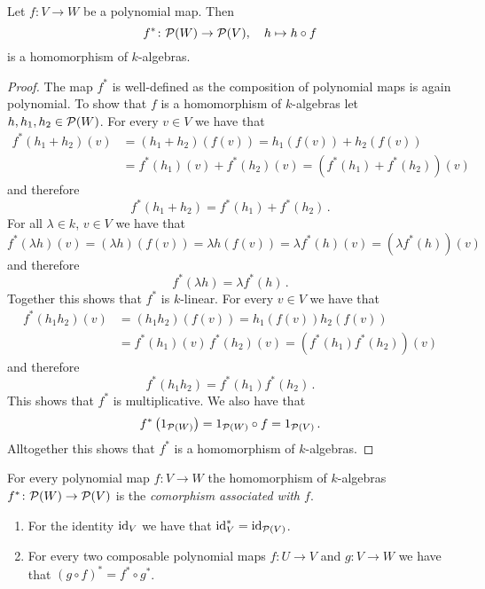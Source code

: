\begin{lemma}
  Let $f \colon V \to W$ be a polynomial map. Then
  \[
            f^*
    \colon  \mathcal{P}(W)
    \to     \mathcal{P}(V),
    \quad   h
    \mapsto h \circ f
  \]
  is a homomorphism of $k$-algebras.
\end{lemma}
\begin{proof}
  The map $f^*$ is well-defined as the composition of polynomial maps is again polynomial.
  To show that $f$ is a homomorphism of $k$-algebras let $h, h_1, h_2 \in \mathcal{P}(W)$.
  For every $v \in V$ we have that
  \begin{align*}
        f^*(h_1+h_2)(v)
    &=  (h_1 + h_2)(f(v))
     =  h_1(f(v)) + h_2(f(v)) \\
    &=  f^*(h_1)(v) + f^*(h_2)(v)
     =  (f^*(h_1)+f^*(h_2))(v)
  \end{align*}
  and therefore
  \[
      f^*(h_1 + h_2)
    = f^*(h_1) + f^*(h_2) \,.
  \]
  For all $\lambda \in k$, $v \in V$ we have that
  \[
      f^*(\lambda h)(v)
    = (\lambda h)(f(v))
    = \lambda h(f(v))
    = \lambda f^*(h)(v)
    = (\lambda f^*(h))(v)
  \]
  and therefore
  \[
      f^*(\lambda h)
    = \lambda f^*(h) \,.
  \]
  Together this shows that $f^*$ is $k$-linear.
  For every $v \in V$ we have that
  \begin{align*}
        f^*(h_1 h_2)(v)
    &=  (h_1 h_2)(f(v))
     =  h_1(f(v)) h_2(f(v)) \\
    &=  f^*(h_1)(v) \, f^*(h_2)(v)
     =  (f^*(h_1) f^*(h_2))(v)
  \end{align*}
  and therefore
  \[
      f^*(h_1 h_2)
    = f^*(h_1) f^*(h_2) \,.
  \]
  This shows that $f^*$ is multiplicative.
  We also have that
  \[
      f^*\left( 1_{\mathcal{P}(W)} \right)
    = 1_{\mathcal{P}(W)} \circ f
    = 1_{\mathcal{P}(V)} \,.
  \]
  Alltogether this shows that $f^*$ is a homomorphism of $k$-algebras.
\end{proof}


\begin{definition}
  For every polynomial map $f \colon V \to W$ the homomorphism of $k$-algebras $f^* \colon \mathcal{P}(W) \to \mathcal{P}(V)$ is the \emph{comorphism associated with $f$}.
\end{definition}


\begin{lemma}
  \label{lemma: functoriality of polynomial algebra}
  \leavevmode
  \begin{enumerate}
    \item
      For the identity $\operatorname{id}_V$ we have that $\operatorname{id}_V^* = \operatorname{id}_{\mathcal{P}(V)}$.
    \item
      For every two composable polynomial maps $f \colon U \to V$ and $g \colon V \to W$ we have that $(g \circ f)^* = f^* \circ g^*$.
  \end{enumerate}
\end{lemma}


